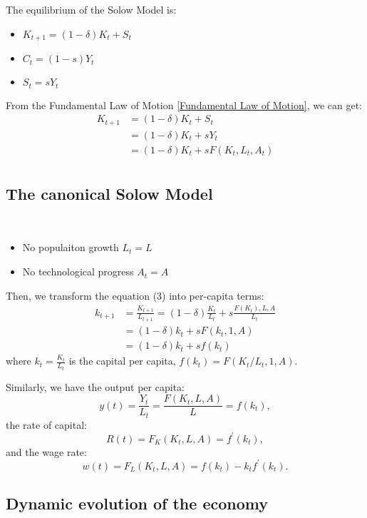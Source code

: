 The equilibrium of the Solow Model is:
\begin{itemize}
    \item $K_{t+1} = (1-\delta)K_t + S_t$
    \item $C_t = (1-s)Y_t$
    \item $S_t = sY_t$
\end{itemize}

From the Fundamental Law of Motion \ref{Fundamental Law of Motion}, we can get:
\begin{align}
    K_{t+1} &= (1-\delta)K_t + S_t\\
    &= (1-\delta)K_t + sY_t\\
    &= (1-\delta)K_t + sF(K_t, L_t, A_t)\\
\end{align}

\subsection{The canonical Solow Model}

\begin{assumption}
    \ 

    \begin{itemize}
        \item No populaiton growth $L_t = L$
        \item No technological progress $A_t = A$
    \end{itemize}
\end{assumption}
Then, we transform the equation (3) into per-capita terms:
\begin{align}
    k_{t+1} &= \frac{K_{t+1}}{L_{t+1}} = (1-\delta) \frac{K_t}{L_t} + s\frac{F(K_t), L, A}{L_t}\\
    &= (1-\delta)k_t + sF(k_t, 1, A) \\
    &= (1-\delta)k_t + sf(k_t)
\end{align}
where $k_t = \frac{K_t}{L_t}$ is the capital per capita, $f(k_t) = F(K_t/L_t, 1, A)$.

Similarly, we have the output per capita:
\[y(t) = \frac{Y_t}{L_t} = \frac{F(K_t, L, A)}{L} = f(k_t),\]
the rate of capital:
\[R(t) = F_K(K_t, L, A) = f^{\prime}(k_t),\]
and the wage rate:
\[w(t) = F_L(K_t, L, A) = f(k_t) - k_tf^{\prime}(k_t).\]

\subsection{Dynamic evolution of the economy}

